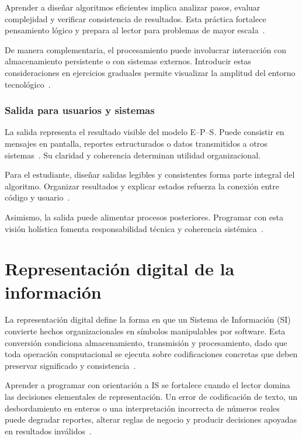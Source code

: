 \documentclass[12pt,twoside]{book}
\begin{document}
						Aprender a diseñar algoritmos eficientes implica analizar pasos, evaluar complejidad y verificar consistencia de resultados. Esta práctica fortalece pensamiento lógico y prepara al lector para problemas de mayor escala~\cite{Sommerville2015Software,Ghezzi2003Fundamentals,Pressman2019Software}.
						
						De manera complementaria, el procesamiento puede involucrar interacción con almacenamiento persistente o con sistemas externos. Introducir estas consideraciones en ejercicios graduales permite visualizar la amplitud del entorno tecnológico~\cite{Elmasri2016Database,Silberschatz2020Database,Tegarden2025Systems}.
						
					\subsubsection{Salida para usuarios y sistemas}
						\noindent
						La salida representa el resultado visible del modelo E–P–S. Puede consistir en mensajes en pantalla, reportes estructurados o datos transmitidos a otros sistemas~\cite{Laudon2020Management,Kendall2014Systems}. Su claridad y coherencia determinan utilidad organizacional.
						
						Para el estudiante, diseñar salidas legibles y consistentes forma parte integral del algoritmo. Organizar resultados y explicar estados refuerza la conexión entre código y usuario~\cite{Dix2004HCI,Gaddis2022Starting,Hanly2015Problem}.
						
						Asimismo, la salida puede alimentar procesos posteriores. Programar con esta visión holística fomenta responsabilidad técnica y coherencia sistémica~\cite{Tegarden2025Systems,Sommerville2015Software,Ghezzi2003Fundamentals}.
							
			\section{Representación digital de la información}
				\noindent
				La representación digital define la forma en que un Sistema de Información (SI) convierte hechos organizacionales en símbolos manipulables por software. Esta conversión condiciona almacenamiento, transmisión y procesamiento, dado que toda operación computacional se ejecuta sobre codificaciones concretas que deben preservar significado y consistencia~\cite{Laudon2020Management,Kendall2014Systems,Tanenbaum2021Structured}.
				
				Aprender a programar con orientación a IS se fortalece cuando el lector domina las decisiones elementales de representación. Un error de codificación de texto, un desbordamiento en enteros o una interpretación incorrecta de números reales puede degradar reportes, alterar reglas de negocio y producir decisiones apoyadas en resultados inválidos~\cite{Gaddis2022Starting,Goldberg1991What,IEEE2019Standard754}.
				
\end{document}
